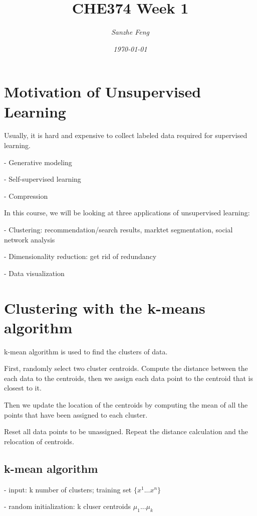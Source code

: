 \documentclass{article}
\begin{document}
\begin{titlepage}

\title{\textbf{CHE374 Week 1}}
\author{\textit{Sanzhe Feng}}
\date{\textit{\today}}
\maketitle
\end{titlepage}
\setlength{\parindent}{0pt}

\section*{Motivation of Unsupervised Learning}
Usually, it is hard and expensive to collect labeled data required for supervised learning.

- Generative modeling

- Self-supervised learning

- Compression

In this course, we will be looking at three applications of unsupervised learning:

- Clustering: recommendation/search results, marktet segmentation, social network analysis

- Dimensionality reduction: get rid of redundancy

- Data visualization

\section*{Clustering with the k-means algorithm}

k-mean algorithm is used to find the clusters of data.

First, randomly select two cluster centroids. Compute the distance between the each data to the centroids, then we assign each data point to the centroid that is closest to it.

Then we update the location of the centroids by computing the mean of all the points that have been assigned to each cluster. 

Reset all data points to be unassigned. Repeat the distance calculation and the relocation of centroids. 


\subsection*{k-mean algorithm}
- input: k number of clusters; training set $\{x^{1}...x^{n}\}$

- random initialization: k cluser centroids $\mu_1...\mu_k$
\end{document}
